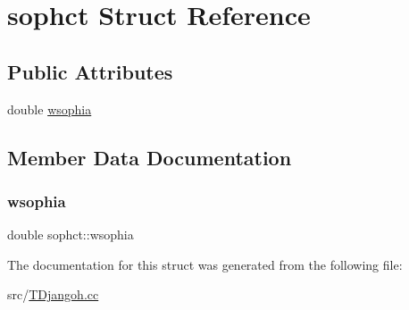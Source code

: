 \hypertarget{structsophct}{}\section{sophct Struct Reference}
\label{structsophct}
\subsection*{Public Attributes}
\begin{DoxyCompactItemize}
\item 
double \hyperlink{structsophct_a365f6c9f3d6b739696ac41bb24a211de}{wsophia}
\end{DoxyCompactItemize}


\subsection{Member Data Documentation}
\mbox{\label{structsophct_a365f6c9f3d6b739696ac41bb24a211de}} 
\subsubsection{\texorpdfstring{wsophia}{wsophia}}
{\footnotesize\ttfamily double sophct\+::wsophia}



The documentation for this struct was generated from the following file\+:\begin{DoxyCompactItemize}
\item 
src/\hyperlink{_t_djangoh_8cc}{T\+Djangoh.\+cc}\end{DoxyCompactItemize}
